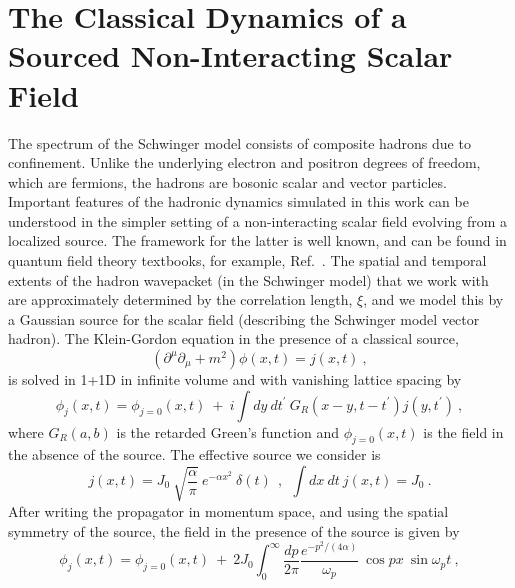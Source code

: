\documentclass[aps, prc, tightenlines,superscriptaddress, letterpaper, amsmath, amssymb, preprintnumbers, floatfix, longbibliography, nofootinbib]{revtex4-2}
\begin{document}
\clearpage
\appendix




\FloatBarrier
\section{The Classical Dynamics of a Sourced Non-Interacting Scalar Field}
\label{app:SFTsrc}
\noindent
The spectrum of the Schwinger model consists of composite hadrons due to confinement.
Unlike the underlying electron and positron degrees of freedom, which are fermions, the hadrons are bosonic scalar and vector particles.
Important features of the hadronic dynamics simulated in this work can be understood in the simpler setting of a non-interacting scalar field evolving from a localized source.
The framework for the latter is well known, and can be found in quantum field theory textbooks, for example, Ref.~\cite{Peskin:1995ev}.
The spatial and temporal extents of the hadron wavepacket (in the Schwinger model) that we work with are approximately determined by the correlation length, $\xi$, and we model this by a Gaussian source for the scalar field (describing the Schwinger model vector hadron). The Klein-Gordon equation in the presence of a classical source,
%
\begin{equation}
    \left( \partial^\mu\partial_\mu + m^2 \right)\phi(x,t) = j(x,t)
    \ ,
    \label{eq:KG1}
\end{equation}
%
is solved in 1+1D in infinite volume and with vanishing lattice spacing by
%
\begin{equation}
    \phi_j(x,t) = \phi_{j=0}(x,t) 
    \ +\ 
    i \int dy\ dt^\prime \ G_R(x-y, t-t^\prime) j(y,t^\prime)
    \ ,
    \label{eq:KG2}
\end{equation}
%
where $G_R(a,b)$ is the retarded Green's function and $\phi_{j=0}(x,t)$ is the field in the absence of the source.
The effective source we consider is 
%
\begin{equation}
    j(x,t) = J_0\ \sqrt{\frac{\alpha}{\pi}}\ e^{-\alpha x^2}\ \delta(t)
    \ \ ,\ \ 
    \int dx\ dt\ j(x,t) = J_0
    \ .
    \label{eq:KG3}
\end{equation}
%
After writing the propagator in momentum space, and using the spatial symmetry of the source, the field in the presence of the source is given by
%
\begin{equation}
    \phi_j(x,t) = \phi_{j=0}(x,t) 
    \ +\ 
2 J_0 \int_0^\infty \frac{dp}{2\pi} \frac{e^{-p^2/(4 \alpha)}}{\omega_p}\ 
\cos p x\ \sin \omega_p t \ ,
    \label{eq:KG4}
\end{equation}
\end{document}

